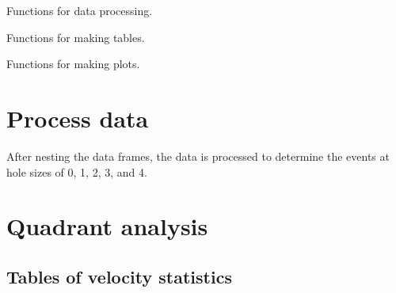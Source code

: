\documentclass[10pt,]{article}
\begin{document}
Functions for data processing.

Functions for making tables.

Functions for making plots.

\hypertarget{process-data}{%
\section{Process data}\label{process-data}}

After nesting the data frames, the data is processed to
determine the events at hole sizes of 0, 1, 2, 3, and 4.

\clearpage

\hypertarget{quadrant-analysis}{%
\section{Quadrant analysis}\label{quadrant-analysis}}

\hypertarget{tables-of-velocity-statistics}{%
\subsection{Tables of velocity statistics}\label{tables-of-velocity-statistics}}

\begingroup\fontsize{7}{9}\selectfont
\end{document}
